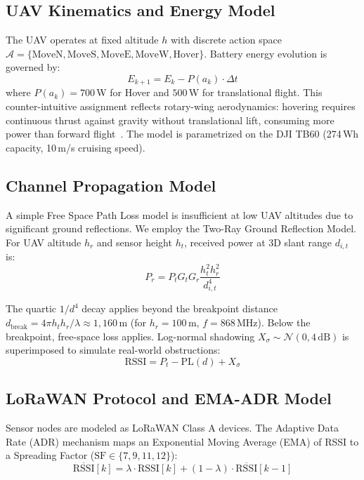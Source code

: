 \documentclass[conference]{IEEEtran}
\begin{document}
\subsection{UAV Kinematics and Energy Model}

The UAV operates at fixed altitude $h$ with discrete action space $\mathcal{A} = \{\text{MoveN}, \text{MoveS}, \text{MoveE}, \text{MoveW}, \text{Hover}\}$. Battery energy evolution is governed by:
\begin{equation}
E_{k+1} = E_k - P(a_k) \cdot \Delta t
\label{eq:battery}
\end{equation}
where $P(a_k) = 700$\,W for Hover and $500$\,W for translational flight. This counter-intuitive assignment reflects rotary-wing aerodynamics: hovering requires continuous thrust against gravity without translational lift, consuming more power than forward flight~\cite{b7}. The model is parametrized on the DJI TB60 (274\,Wh capacity, 10\,m/s cruising speed).

\subsection{Channel Propagation Model}

A simple Free Space Path Loss model is insufficient at low UAV altitudes due to significant ground reflections. We employ the Two-Ray Ground Reflection Model. For UAV altitude $h_r$ and sensor height $h_t$, received power at 3D slant range $d_{i,t}$ is:
\begin{equation}
P_r = P_t G_t G_r \frac{h_t^2 h_r^2}{d_{i,t}^4}
\label{eq:tworay}
\end{equation}

The quartic $1/d^4$ decay applies beyond the breakpoint distance $d_{\text{break}} = 4\pi h_t h_r / \lambda \approx 1{,}160$\,m (for $h_r = 100$\,m, $f = 868$\,MHz). Below the breakpoint, free-space loss applies. Log-normal shadowing $X_\sigma \sim \mathcal{N}(0, 4\,\text{dB})$ is superimposed to simulate real-world obstructions:
\begin{equation}
\text{RSSI} = P_t - \text{PL}(d) + X_\sigma
\label{eq:rssi}
\end{equation}

\subsection{LoRaWAN Protocol and EMA-ADR Model}

Sensor nodes are modeled as LoRaWAN Class A devices. The Adaptive Data Rate (ADR) mechanism maps an Exponential Moving Average (EMA) of RSSI to a Spreading Factor ($\text{SF} \in \{7, 9, 11, 12\}$):
\begin{equation}
\overline{\text{RSSI}}[k] = \lambda \cdot \text{RSSI}[k] + (1 - \lambda) \cdot \overline{\text{RSSI}}[k-1]
\label{eq:ema}
\end{equation}
\end{document}
